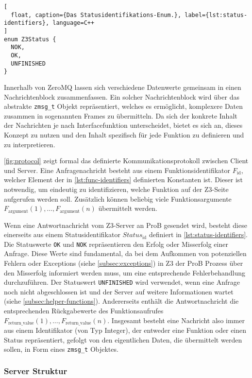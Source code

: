 \begin{lstlisting}[
  float, caption={Das Statusidentifikations-Enum.}, label={lst:status-identifiers}, language=C++
]
enum Z3Status {
  NOK,
  OK,
  UNFINISHED
}
\end{lstlisting}

Innerhalb von ZeroMQ lassen sich verschiedene Datenwerte gemeinsam in einen Nachrichtenblock zusammenfassen.
Ein solcher Nachrichtenblock wird über das abstrakte \texttt{zmsg\_t} Objekt repräsentiert, welches es ermöglicht,
komplexere Daten zusammen in sogenannten Frames zu übermitteln.
Da sich der konkrete Inhalt der Nachrichten je nach Interfacefunktion unterscheidet,
bietet es sich an, dieses Konzept zu nutzen und den Inhalt spezifisch für jede Funktion zu definieren und zu interpretieren.

\cref{fig:protocol} zeigt formal das definierte Kommunikationsprotokoll zwischen Client und Server.
Eine Anfragenachricht besteht aus einem Funktionsidentifikator $F_\text{id}$, welcher Element der in \cref{lst:func-identifiers} definierten Konstanten ist.
Dieser ist notwendig, um eindeutig zu identifizieren, welche Funktion auf der Z3-Seite aufgerufen werden soll.
Zusätzlich können beliebig viele Funktionsargumente $F_\text{argument}(1), \ldots, F_\text{argument}(n)$ übermittelt werden.

Wenn eine Antwortnachricht vom Z3-Server an ProB gesendet wird, besteht diese einerseits aus einem Statusidentifikator $Status_\text{id}$ definiert in \cref{lst:status-identifiers}.
Die Statuswerte \texttt{OK} und \texttt{NOK} repräsentieren den Erfolg oder Misserfolg einer Anfrage.
Diese Werte sind fundamental, da bei dem Aufkommen von potenziellen Fehlern oder Exceptions (siehe \cref{subsec:exceptions}) in Z3 der ProB Prozess über den Misserfolg informiert werden muss,
um eine entsprechende Fehlerbehandlung durchzuführen.
Der Statuswert \texttt{UNFINISHED} wird verwendet, wenn eine Anfrage noch nicht abgeschlossen ist und der Server auf weitere Informationen wartet (siehe \cref{subsec:helper-functions}).
Andererseits enthält die Antwortnachricht die entsprechenden Rückgabewerte des Funktionsaufrufes $F_\text{return\_value}(1), \ldots, F_\text{return\_value}(n)$.
Insgesamt besteht eine Nachricht also immer aus einem Identifikator (von Typ Integer), der entweder eine Funktion oder einen Status repräsentiert,
gefolgt von den eigentlichen Daten, die übermittelt werden sollen, in Form eines \texttt{zmsg\_t} Objektes.

\subsubsection{Server Struktur}

